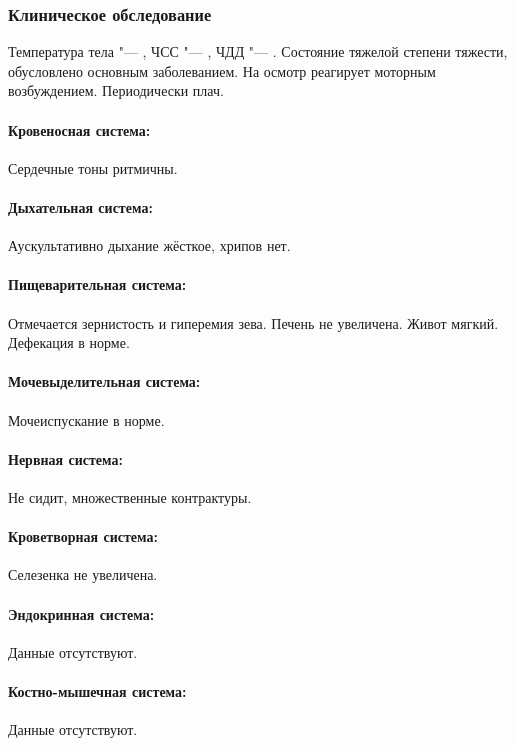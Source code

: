 \documentclass[a4paper,14pt]{extarticle}
\newcommand{\oCelsius}{\tcdegree{}C}
\newcommand{\bpm}{уд/мин}
\newcommand{\mpm}{/мин}
\begin{document}
\subsubsection*{Клиническое обследование}

Температура тела "--- \numprint[\oCelsius]{36.6}, ЧСС "--- \numprint[\bpm]{100}, ЧДД "--- \numprint[\mpm]{24}.
Состояние тяжелой степени тяжести, обусловлено основным заболеванием.
На осмотр реагирует моторным возбуждением.
Периодически плач.

\paragraph{Кровеносная система:} Сердечные тоны ритмичны.

\paragraph{Дыхательная система:} Аускультативно дыхание жёсткое, хрипов нет.

\paragraph{Пищеварительная система:} Отмечается зернистость и гиперемия зева. Печень не увеличена. Живот мягкий. Дефекация в норме.

\paragraph{Мочевыделительная система:} Мочеиспускание в норме.

\paragraph{Нервная система:} Не сидит, множественные контрактуры.

\paragraph{Кроветворная система:} Селезенка не увеличена.

\paragraph{Эндокринная система:} Данные отсутствуют.

\paragraph{Костно-мышечная система:} Данные отсутствуют.
\end{document}

